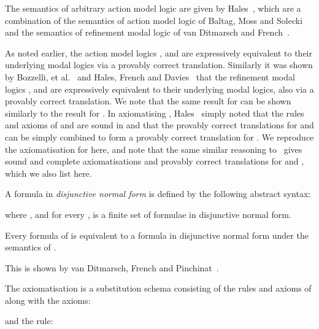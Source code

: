 \documentclass[twoside]{aiml14}
\begin{document}
  The semantics of arbitrary action model logic are given by Hales~\cite{hales2013},
  which are a combination of the semantics of action model logic of Baltag, Moss and Solecki~\cite{baltag1998,baltag2005}
  and the semantics of refinement modal logic of van Ditmarsch and French~\cite{vanditmarsch2009}.

  As noted earlier, the action model logics \logicAmlK{}, \logicAmlKFF{} and
  \logicAmlS{} are expressively equivalent to their underlying modal logics via
  a provably correct translation. Similarly it was shown by Bozzelli, et
  al.~\cite{bozzelli2012a} and Hales, French and Davies~\cite{hales2012} that
  the refinement modal logics \logicRmlK{}, \logicRmlKD{} and \logicS{} are
  expressively equivalent to their underlying modal logics, also via a provably
  correct translation. We note that the same result for \logicRmlKFF{} can be
  shown similarly to the result for \logicRmlKD{}. In axiomatising
  \logicAamlK{}, Hales~\cite{hales2013} simply noted that the rules and axioms
  of \axiomAmlK{} and \axiomRmlK{} are sound in \logicAamlK{} and that the
  provably correct translations for \logicAmlK{} and \logicRmlK{} can be
  simply combined to form a provably correct translation for \logicAamlK{}.
  We reproduce the axiomatisation for \logicAamlK{} here, and note that the same
  similar reasoning to~\cite{hales2013} gives sound and complete
  axiomatisations and provably correct translations for \logicAamlKFF{} and
  \logicAamlS{}, which we also list here.

  \begin{definition}\label{dnf}
      A formula in {\em disjunctive normal form} is defined by the following abstract syntax:
      
      where ,  and for every ,
       is a finite set of formulae in disjunctive normal form.
  \end{definition}

  \begin{proposition}
      Every formula of \lang{} is equivalent to a formula in disjunctive normal
      form under the semantics of \logicK{}.
  \end{proposition}

  This is shown by van Ditmarsch, French and Pinchinat~\cite{vanditmarsch2010}.

  \begin{definition}
      The axiomatisation \axiomAamlK{} is a substitution schema consisting of
      the rules and axioms of \axiomAmlK{} along with the axioms:
      
      and the rule:
      
  \end{definition}
  
\end{document}

